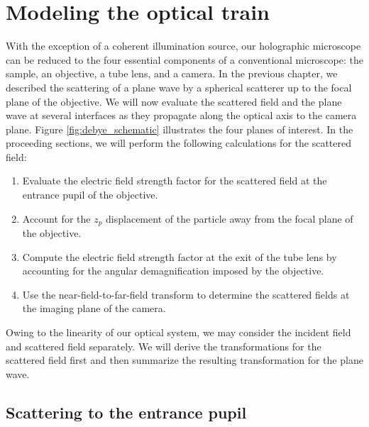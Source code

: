 \section{Modeling the optical train}

With the exception of a coherent illumination source, our holographic microscope
can be reduced to the four essential components of a conventional microscope:
the sample, an objective, a tube lens, and a camera. In the previous chapter,
we described the scattering of a plane wave by a spherical scatterer up to
the focal plane of the objective. We will now evaluate the scattered field and
the plane wave at several interfaces as they propagate along the optical axis
to the camera plane. Figure \ref{fig:debye_schematic} illustrates the four planes
of interest. In the proceeding sections, we will perform the following calculations
for the scattered field:
\begin{enumerate}
\item Evaluate the electric field strength factor for the scattered field at
  the entrance pupil of the objective.
\item Account for the  $z_p$ displacement of the particle away from the focal
  plane of the objective.
\item Compute the electric field strength factor at the exit of the tube lens
  by accounting for the angular demagnification imposed by the objective.
\item Use the near-field-to-far-field transform to determine the scattered
  fields at the imaging plane of the camera.
\end{enumerate}
Owing to the linearity of our optical system, we may consider the incident field
and scattered field separately. We will derive the transformations for the
scattered field first and then summarize the resulting transformation for the
plane wave.

\subsection{Scattering to the entrance pupil}

